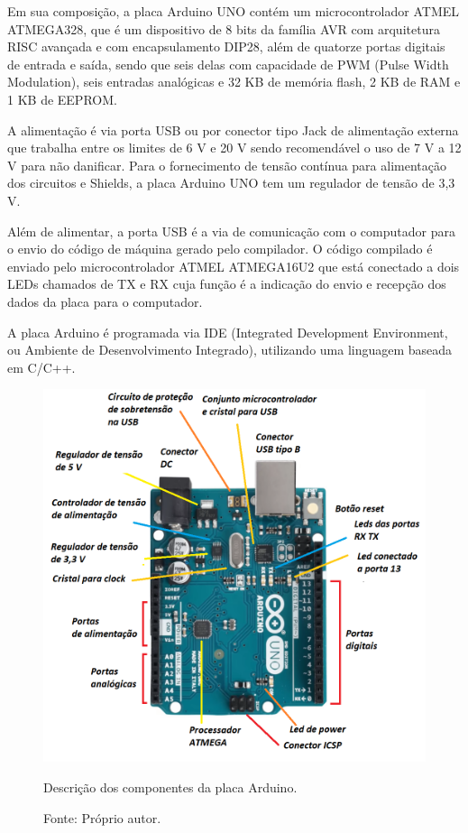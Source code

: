 Em sua composição, a placa Arduino UNO contém um microcontrolador ATMEL ATMEGA328, que é um dispositivo 
de 8 bits da família AVR com arquitetura RISC avançada e com encapsulamento DIP28, além de quatorze portas 
digitais de entrada e saída, sendo que seis delas com capacidade de PWM (Pulse Width Modulation), seis 
entradas analógicas e 32 KB de memória flash, 2 KB de RAM e 1 KB de EEPROM. 

A alimentação é via porta USB ou por conector tipo Jack de alimentação externa que trabalha entre os 
limites de 6 V e 20 V sendo recomendável o uso de 7 V a 12 V para não danificar. Para o fornecimento 
de tensão contínua para alimentação dos circuitos e Shields, a placa Arduino UNO tem um regulador de tensão de 3,3 V.

Além de alimentar, a porta USB é a via de comunicação com o computador para o envio do código de máquina 
gerado pelo compilador. O código compilado é enviado pelo microcontrolador ATMEL ATMEGA16U2 que está 
conectado a dois LEDs chamados de TX e RX cuja função é a indicação do envio e recepção dos dados da 
placa para o computador.

A placa Arduino é programada via IDE (Integrated Development Environment, ou Ambiente de Desenvolvimento 
Integrado), utilizando uma linguagem baseada em C/C++.

\begin{figure}[!htb]
\centering
\includegraphics[scale = 0.5]{figuras/3-12}
\caption{Descrição dos componentes da placa Arduino.}
\caption*{Fonte: Próprio autor.}
\label{fig:placaarduino}
\end{figure}
    
